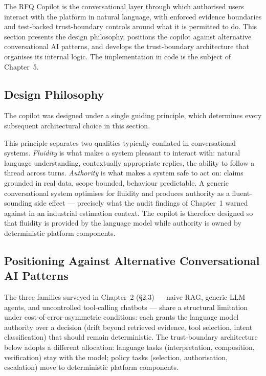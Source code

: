 The RFQ Copilot is the conversational layer through which authorised users interact with the platform in natural language, with enforced evidence boundaries and test-backed trust-boundary controls around what it is permitted to do. This section presents the design philosophy, positions the copilot against alternative conversational AI patterns, and develops the trust-boundary architecture that organises its internal logic. The implementation in code is the subject of Chapter~5.

\subsection{Design Philosophy}
The copilot was designed under a single guiding principle, which determines every subsequent architectural choice in this section.

\begin{center}
\end{center}

This principle separates two qualities typically conflated in conversational systems. \textit{Fluidity} is what makes a system pleasant to interact with: natural language understanding, contextually appropriate replies, the ability to follow a thread across turns. \textit{Authority} is what makes a system safe to act on: claims grounded in real data, scope bounded, behaviour predictable. A generic conversational system optimises for fluidity and produces authority as a fluent-sounding side effect --- precisely what the audit findings of Chapter~1 warned against in an industrial estimation context. The copilot is therefore designed so that fluidity is provided by the language model while authority is owned by deterministic platform components.

\subsection{Positioning Against Alternative Conversational AI Patterns}
The three families surveyed in Chapter~2 (§2.3) --- naive RAG, generic LLM agents, and uncontrolled tool-calling chatbots --- share a structural limitation under cost-of-error-asymmetric conditions: each grants the language model authority over a decision (drift beyond retrieved evidence, tool selection, intent classification) that should remain deterministic. The trust-boundary architecture below adopts a different allocation: language tasks (interpretation, composition, verification) stay with the model; policy tasks (selection, authorisation, escalation) move to deterministic platform components.


